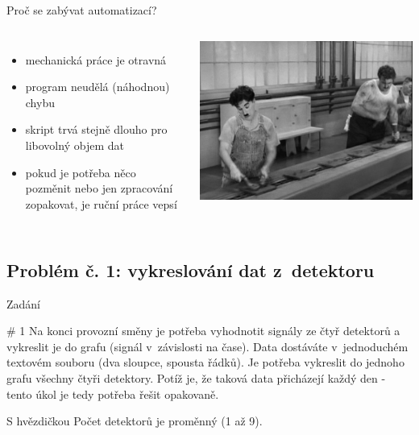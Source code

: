 \documentclass{beamer}
\begin{document}
\begin{frame}{Proč se zabývat automatizací?}
  \begin{columns}
    \begin{itemize}
      \item mechanická práce je otravná
      \item program neudělá (náhodnou) chybu
      \item skript trvá stejně dlouho pro libovolný objem dat
      \item pokud je potřeba něco pozměnit nebo jen zpracování zopakovat, je ruční práce vepsí
    \end{itemize}
    \includegraphics[width=\columnwidth]{chaplin}
  \end{columns}
\end{frame}

\subsection{Problém č. 1: vykreslování dat z~detektoru}

\begin{frame}{Zadání}
  \begin{block}{\# 1}
    Na konci provozní směny je potřeba vyhodnotit signály ze čtyř detektorů a vykreslit je do grafu (signál v~závislosti na čase). Data dostáváte v~jednoduchém textovém souboru (dva sloupce, spousta řádků). Je potřeba vykreslit do jednoho grafu všechny čtyři detektory. Potíž je, že taková data přicházejí každý den - tento úkol je tedy potřeba řešit opakovaně.
  \end{block}
  \begin{block}{S hvězdičkou}
    Počet detektorů je proměnný (1 až 9).
  \end{block}
\end{frame}
\end{document}
